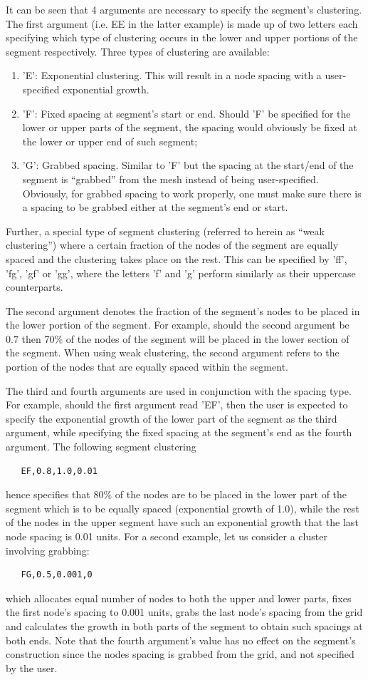 \documentclass{warpdoc}
\begin{document}
It can be seen that 4 arguments are
necessary to specify the segment's clustering. The first argument
(i.e. EE in the latter example) is made up of two letters
each specifying which type of clustering
occurs in the lower and upper portions of the segment respectively.
Three types of clustering are available: 
\begin{enumerate}
\item
 'E': Exponential clustering.
  This will result in a node spacing with a user-specified exponential growth. 
\item 'F': Fixed spacing at segment's start or end. Should 'F' be specified for
the lower or upper parts of the segment, the spacing would obviously
be fixed at the lower or upper end of such segment; 
\item 'G': Grabbed spacing. Similar to 'F' but the spacing at the start/end of the segment
  is ``grabbed'' from the mesh instead of being user-specified. Obviously, for grabbed
spacing to work properly, one must make sure there is a spacing to be
grabbed either at the segment's end or start. 
\end{enumerate}
Further, a special type of segment
clustering (referred to herein as ``weak clustering'')
where a certain fraction of the nodes of the segment are
equally spaced and the clustering takes place on the rest. This can be specified by 
 'ff', 'fg', 'gf' or 'gg',
where the letters 'f' and 'g' perform similarly as their uppercase
counterparts. 

The second argument denotes the fraction of the segment's nodes
to be placed in the lower portion of the segment. For example,
should the second argument be $0.7$ then 70\% of the nodes of the segment
will be placed in the lower section of the segment. When using weak
clustering, the second argument refers to the portion of the nodes
that are equally spaced within the segment.

The third and fourth arguments are used in conjunction with the spacing
type. For example, should the first argument read 'EF', then the user
is expected to specify the exponential growth of the lower part
of the segment as the third argument, while specifying the fixed spacing
at the segment's end as the fourth argument. The following segment
clustering
%
\begin{verbatim}
   EF,0.8,1.0,0.01
\end{verbatim}
%
hence specifies that 80\% of the nodes are to be placed
in the lower part of the segment which is to be equally spaced
(exponential growth of 1.0), while the rest of the nodes in
the upper segment have such an exponential growth that the last
node spacing is 0.01 units. For a second example, let us consider
a cluster involving grabbing:
%
\begin{verbatim}
   FG,0.5,0.001,0
\end{verbatim}
%
which allocates equal number of nodes to both the upper and lower
parts, fixes the first node's spacing to 0.001 units, grabs the last
node's spacing from the grid and calculates the growth
in both parts of the segment to obtain such spacings at both ends.
Note that the fourth argument's value has no effect on the segment's
construction since the nodes spacing is grabbed from the grid, and not specified
by the user.
\end{document}

